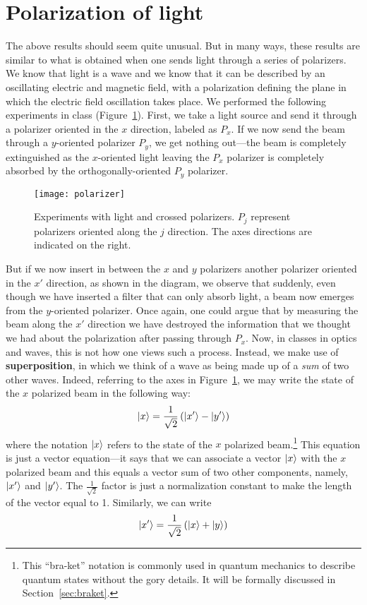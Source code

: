 \section{Polarization of light}
The above results should seem quite unusual. But in many ways, these results are similar to what is obtained when one sends light through a series of polarizers. We know that light is a wave and we know that it can be described by an oscillating electric and magnetic field, with a polarization defining the plane in which the electric field oscillation takes place. We performed the following experiments in class (Figure~\ref{fig:polarizer}). First, we take a light source and send it through a polarizer oriented in the $x$ direction, labeled as $P_x$. If we now send the beam through a $y$-oriented polarizer $P_y$, we get nothing out---the beam is completely extinguished as the $x$-oriented light leaving the $P_x$ polarizer is completely absorbed by the orthogonally-oriented $P_y$ polarizer. \par

\begin{figure}[!h]
	\centering
	\texttt{[image: polarizer]}
	\caption{Experiments with light and crossed polarizers. $P_j$ represent polarizers oriented along the $j$ direction. The axes directions are indicated on the right.}
	\label{fig:polarizer}
\end{figure}

But if we now insert in between the $x$ and $y$ polarizers another polarizer oriented in the $x'$ direction, as shown in the diagram, we observe that suddenly, even though we have inserted a filter that can only absorb light, a beam now emerges from the $y$-oriented polarizer. Once again, one could argue that by measuring the beam along the $x'$ direction we have destroyed the information that we thought we had about the polarization after passing through $P_x$. Now, in classes in optics and waves, this is not how one views such a process. Instead, we make use of \textbf{superposition}, in which we think of a wave as being made up of a \emph{sum} of two other waves. Indeed, referring to the axes in Figure~\ref{fig:polarizer}, we may write the state of the $x$ polarized beam in the following way:
\begin{equation}
	\ket{x} = \frac{1}{\sqrt{2}} \left( \ket{x'} - \ket{y'} \right) \label{eq:sup-polar}
\end{equation}
where the notation $\ket{x}$ refers to the state of the $x$ polarized beam.\footnote{This ``bra-ket'' notation is commonly used in quantum mechanics to describe quantum states without the gory details. It will be formally discussed in Section~\ref{sec:braket}.} This equation is just a vector equation---it says that we can associate a vector $\ket{x}$ with the $x$ polarized beam and this equals a vector sum of two other components, namely, $\ket{x'}$ and $\ket{y'}$. The $\frac{1}{\sqrt{2}}$ factor is just a normalization constant to make the length of the vector equal to 1. Similarly, we can write
\begin{equation}
\ket{x'} = \frac{1}{\sqrt{2}} \left( \ket{x} + \ket{y} \right) \label{eq:sup-polar2}
\end{equation}

